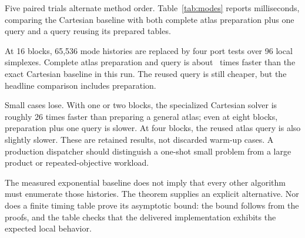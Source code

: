 Five paired trials alternate method order. Table~\ref{tab:modes} reports milliseconds, comparing the Cartesian baseline with both complete atlas preparation plus one query and a query reusing its prepared tables.

\begin{table}[ht]
\centering\small

\caption{Exact synchronized sleeve benchmark, medians of five trials in milliseconds. ``Total ratio'' is Cartesian time divided by atlas preparation-plus-query time; ratios below one are regressions. No row is a knot-recognition benchmark.}
\label{tab:modes}
\end{table}

At 16 blocks, 65,536 mode histories are replaced by four port tests over 96 local simplexes. Complete atlas preparation and query is about \ModeRatio\ times faster than the exact Cartesian baseline in this run. The reused query is still cheaper, but the headline comparison includes preparation.

Small cases lose. With one or two blocks, the specialized Cartesian solver is roughly 26 times faster than preparing a general atlas; even at eight blocks, preparation plus one query is slower. At four blocks, the reused atlas query is also slightly slower. These are retained results, not discarded warm-up cases. A production dispatcher should distinguish a one-shot small problem from a large product or repeated-objective workload.

The measured exponential baseline does not imply that every other algorithm must enumerate those histories. The theorem supplies an explicit alternative. Nor does a finite timing table prove its asymptotic bound: the bound follows from the proofs, and the table checks that the delivered implementation exhibits the expected local behavior.
